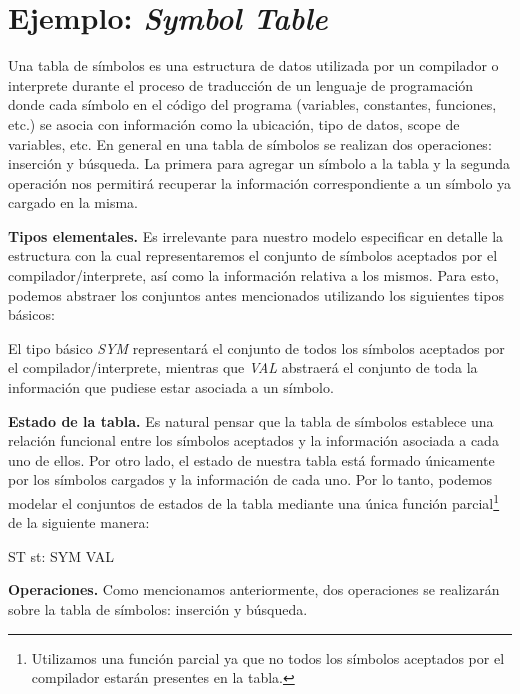 \section{Ejemplo: \emph{Symbol Table}}
\label{sec:ej-symbolTable}

Una tabla de símbolos es una estructura de datos utilizada por un compilador o interprete durante el proceso de traducción de un lenguaje de programación donde cada símbolo en el código del programa (variables, constantes, funciones, etc.) se asocia con información como la ubicación, tipo de datos, scope de variables, etc. 
En general en una tabla de símbolos se realizan dos operaciones: inserción y búsqueda. La primera para agregar un símbolo a la tabla y la segunda operación nos permitirá recuperar la información correspondiente a un símbolo ya cargado en la misma.


\bigskip
\noindent
\textbf{Tipos elementales.} Es irrelevante para nuestro modelo especificar en detalle la estructura con la cual representaremos el conjunto de símbolos aceptados por el compilador/interprete, así como la información relativa a los mismos. Para esto, podemos abstraer los conjuntos antes mencionados utilizando los siguientes tipos básicos: 

\begin{zed}
\end{zed}

El tipo básico \emph{SYM} representará el conjunto de todos los símbolos aceptados por el compilador/interprete, mientras que \emph{VAL} abstraerá el conjunto de toda la información que pudiese estar asociada a un símbolo.
 
\bigskip
\noindent
\textbf{Estado de la tabla.} Es natural pensar que la tabla de símbolos establece una relación funcional entre los símbolos aceptados y la información asociada a cada uno de ellos. Por otro lado, el estado de nuestra tabla está formado únicamente por los símbolos cargados y la información de cada uno. Por lo tanto, podemos modelar el conjuntos de estados de la tabla mediante una única función parcial\footnote{Utilizamos una función parcial ya que no todos los símbolos aceptados por el compilador estarán presentes en la tabla.} de la siguiente manera:

\begin{schema}{ST}
st: SYM \pfun VAL
\end{schema}

\bigskip
\noindent
\textbf{Operaciones.} Como mencionamos anteriormente, dos operaciones se realizarán sobre la tabla de símbolos: inserción y búsqueda.

